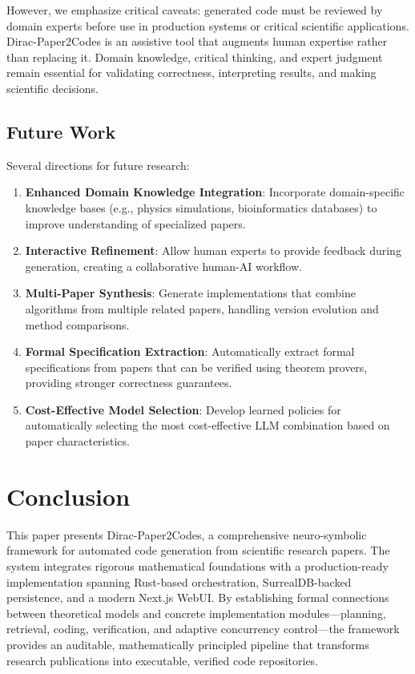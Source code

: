 \documentclass{ieeeaccess}
\begin{document}
However, we emphasize critical caveats: generated code must be reviewed by domain experts before use in production systems or critical scientific applications. Dirac-Paper2Codes is an assistive tool that augments human expertise rather than replacing it. Domain knowledge, critical thinking, and expert judgment remain essential for validating correctness, interpreting results, and making scientific decisions.

\subsection{Future Work}
Several directions for future research:

\begin{enumerate}
\item \textbf{Enhanced Domain Knowledge Integration}: Incorporate domain-specific knowledge bases (e.g., physics simulations, bioinformatics databases) to improve understanding of specialized papers.

\item \textbf{Interactive Refinement}: Allow human experts to provide feedback during generation, creating a collaborative human-AI workflow.

\item \textbf{Multi-Paper Synthesis}: Generate implementations that combine algorithms from multiple related papers, handling version evolution and method comparisons.

\item \textbf{Formal Specification Extraction}: Automatically extract formal specifications from papers that can be verified using theorem provers, providing stronger correctness guarantees.

\item \textbf{Cost-Effective Model Selection}: Develop learned policies for automatically selecting the most cost-effective LLM combination based on paper characteristics.
\end{enumerate}

\section{Conclusion}\label{sec:conclusion}
This paper presents Dirac-Paper2Codes, a comprehensive neuro-symbolic framework for automated code generation from scientific research papers. The system integrates rigorous mathematical foundations with a production-ready implementation spanning Rust-based orchestration, SurrealDB-backed persistence, and a modern Next.js WebUI. By establishing formal connections between theoretical models and concrete implementation modules---planning, retrieval, coding, verification, and adaptive concurrency control---the framework provides an auditable, mathematically principled pipeline that transforms research publications into executable, verified code repositories.
\end{document}
